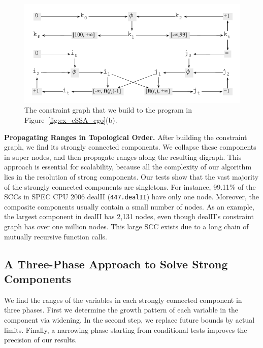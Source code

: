 \documentclass{sigplanconf}[10pt]
\begin{document}
\begin{figure}[t!]
\begin{center}
\includegraphics[width=\columnwidth]{images/ex_graph}
\end{center}
\caption{\label{fig:ex_graph}
The constraint graph that we build to the program in
Figure~\ref{fig:ex_eSSA_cgo}(b).}
\end{figure}

\noindent
\textbf{Propagating Ranges in Topological Order. }
After building the constraint graph, we find its strongly connected components.
We collapse these components in super nodes, and then propagate
ranges along the resulting digraph.
This approach is essential for scalability, because all the complexity of our
algorithm lies in the resolution of strong components.
Our tests show that the vast majority of the strongly connected components are
singletons.
For instance, 99.11\% of the SCCs in SPEC CPU 2006 dealII (\texttt{447.dealII}) have
only one node.
Moreover, the composite components usually contain a small number of nodes.
As an example, the largest component in dealII has 2,131 nodes,
even though dealII's constraint graph has over one million nodes.
This large SCC exists due to a long chain of mutually recursive function calls.

\subsection{A Three-Phase Approach to Solve Strong Components}
\label{sub:micro}

We find the ranges of the variables in each strongly connected component in
three phases.
First we determine the growth pattern of each variable in the component via
widening.
In the second step, we replace future bounds by actual limits.
Finally, a narrowing phase starting from conditional tests improves the
precision of our results.
\end{document}
